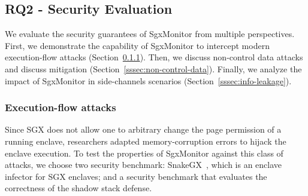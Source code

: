 \subsection{RQ2 - Security Evaluation}
\label{ssec:security-properties}

We evaluate the security guarantees of SgxMonitor from multiple 
perspectives.
First, we demonstrate the capability of SgxMonitor to intercept 
modern execution-flow attacks (Section~\ref{sssec:execution-flow-attacks}).
Then, we discuss non-control data attacks and discuss mitigation
(Section~\ref{sssec:non-control-data}).
Finally, we analyze the impact of SgxMonitor in side-channels scenarios 
(Section~\ref{sssec:info-leakage}).

\subsubsection{Execution-flow attacks}
\label{sssec:execution-flow-attacks}

Since SGX does not allow one to arbitrary change the page permission of a 
running enclave, 
researchers adapted memory-corruption errors to hijack the enclave execution.
To test the properties of SgxMonitor against this class of attacks, we 
choose two security benchmark: \textsf{SnakeGX}~\citep{snakegx}, which is an 
enclave infector for SGX enclaves; and a security benchmark 
that evaluates the correctness of the shadow stack defense.

